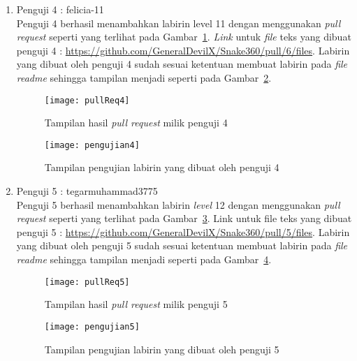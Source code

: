 \begin{enumerate}
	\item Penguji 4 : felicia-11\\
	Penguji 4 berhasil menambahkan labirin level 11 dengan menggunakan \textit{pull request} seperti yang terlihat pada Gambar~\ref{fig:pullReq4}. \textit{Link} untuk \textit{file} teks yang dibuat penguji 4 : \url{https://github.com/GeneralDevilX/Snake360/pull/6/files}. Labirin yang dibuat oleh penguji 4 sudah sesuai ketentuan membuat labirin pada \textit{file readme} sehingga tampilan menjadi seperti pada Gambar~\ref{fig:pengujian4}.
	
	\begin{figure}[H]
		\centering  
		\texttt{[image: pullReq4]}  
		\caption[Tampilan hasil \textit{pull request} milik penguji 4]{Tampilan hasil \textit{pull request} milik penguji 4}
		\label{fig:pullReq4} 
	\end{figure}
	
	\begin{figure}[H]
		\centering  
		\texttt{[image: pengujian4]}  
		\caption[Tampilan pengujian labirin yang dibuat oleh penguji 4]{Tampilan pengujian labirin yang dibuat oleh penguji 4}
		\label{fig:pengujian4} 
	\end{figure}
	
	\item Penguji 5 : tegarmuhammad3775\\
	Penguji 5 berhasil menambahkan labirin \textit{level} 12 dengan menggunakan \textit{pull request} seperti yang terlihat pada Gambar~\ref{fig:pullReq5}. Link untuk file teks yang dibuat penguji 5 : \url{https://github.com/GeneralDevilX/Snake360/pull/5/files}. Labirin yang dibuat oleh penguji 5 sudah sesuai ketentuan membuat labirin pada \textit{file readme} sehingga tampilan menjadi seperti pada Gambar~\ref{fig:pengujian5}.
	
	\begin{figure}[H]
		\centering  
		\texttt{[image: pullReq5]}  
		\caption[Tampilan hasil \textit{pull request} milik penguji 5]{Tampilan hasil \textit{pull request} milik penguji 5}
		\label{fig:pullReq5} 
	\end{figure}
	
	\begin{figure}[H]
		\centering  
		\texttt{[image: pengujian5]}  
		\caption[Tampilan pengujian labirin yang dibuat oleh penguji 5]{Tampilan pengujian labirin yang dibuat oleh penguji 5}
		\label{fig:pengujian5} 
	\end{figure}
\end{enumerate}